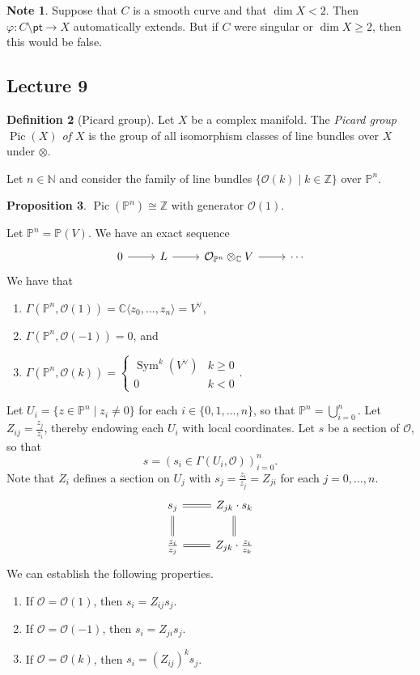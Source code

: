 \documentclass[10pt,letterpaper,cm]{nupset}
\theoremstyle{definition}
\newtheorem{defn}{Definition}[subsection]
\newtheorem{note}[defn]{Note}
\theoremstyle{theorem}
\newtheorem{prop}[defn]{Proposition}
\theoremstyle{remark}
\newcommand{\C}{\mathbb C}
\newcommand{\N}{\mathbb N}
\renewcommand{\O}{\mathcal O}
\renewcommand{\P}{\mathbb P}
\newcommand{\Z}{\mathbb Z}
\newcommand{\1}{\mathbb{1}}
\newcommand{\0}{\vec 0}
\newcommand{\pt}{\mathsf{pt}}
\DeclareMathOperator{\pic}{Pic}
\DeclareMathOperator{\sym}{Sym}
\newcommand{\be}{\begin{enumerate}}
\newcommand{\ee}{\end{enumerate}}
\begin{document}
\begin{note}
Suppose that $C$ is a smooth curve and that $\dim{X} < 2$. Then $\varphi : C \setminus \pt \to X$ automatically extends.  But if $C$ were singular or $\dim{X} \geq 2$, then this would be false.
\end{note}

\subsection{Lecture 9}

\begin{defn}[Picard group]
Let $X$ be a complex manifold. The \textit{Picard group $\pic(X)$ of $X$} is the group of all isomorphism classes of line bundles over $X$ under $\otimes$.
\end{defn}

Let $n\in \N$ and consider the family of line bundles $\{\O(k) \mid k \in \Z\}$ over $\P^n$.

\begin{prop}
$\pic\left(\P^n\right) \cong \Z$ with generator $\O(1)$. 
\end{prop}

Let $\P^n = \P(V)$. We have an exact sequence
\[
\begin{tikzcd}
0 \arrow[r] & L \arrow[r] & \O_{\P^n}\otimes_{\C} V \arrow[r] & \cdots
\end{tikzcd}
\]
We have that
\be
\item $\Gamma\left(\P^n , \O(1)\right) = \C\langle z_0, \ldots, z_n\rangle = V^{\vee}$,
\item $\Gamma \left(\P^n, \O({-1})\right) =0$, and
\item $\Gamma \left(\P^n, \O(k)\right) = \begin{cases} \sym^k\left(V^{\vee}\right) & k\geq0 \\ 0 & k<0\end{cases}$.
\ee

Let $U_i = \{z \in \P^n \mid z_i \ne 0\}$ for each $i\in \{0, 1, \ldots, n\}$, so that $\P^n = \bigcup_{i=0}^n$. Let $Z_{ij} = \frac{z_j}{z_i}$, thereby endowing each $U_i$ with local coordinates. Let $s$ be a section of $\O$, so that $$s = \left(s_i \in \Gamma\left(U_i, \O\right)\right)_{i=0}^n.$$ Note that $Z_i$ defines a section on $U_j$ with $s_j = \frac{z_i}{z_j} = Z_{ji}$ for each $j=0, \ldots, n$. 
\[
\begin{tikzcd}
s_j \arrow[r, equals] \arrow[d, equals]   & Z_{jk}\cdot s_k \arrow[d, equals]  \\
\frac{z_i}{z_j} \arrow[r, equals] & Z_{jk}\cdot\frac{z_i}{z_k}
\end{tikzcd}
\]
We can establish the following properties.
\be
\item If $\O= \O(1)$, then $s_i = Z_{ij}s_j$.
\item If $\O = \O({-1})$, then $s_i = Z_{ji}s_j$.
\item If $\O = \O(k)$, then $s_i = \left(Z_{ij}\right)^ks_j$.
\ee
\end{document}
